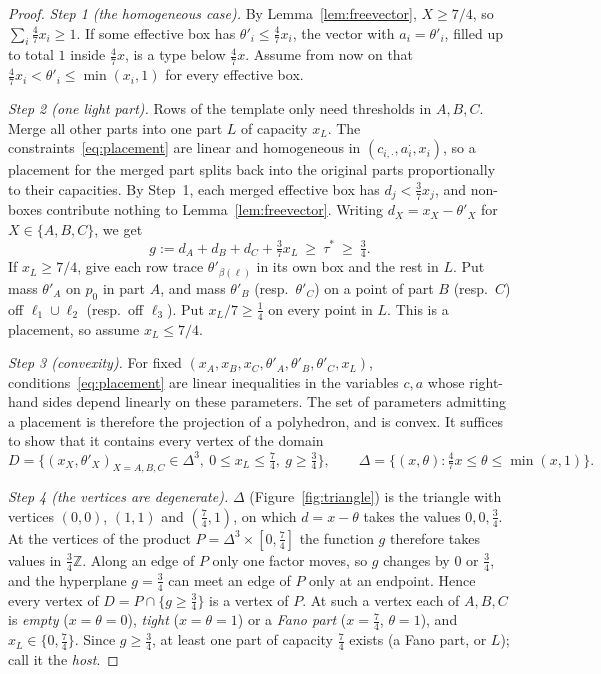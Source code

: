 \documentclass[11pt]{amsart}
\theoremstyle{definition}
\theoremstyle{remark}
\begin{document}
\begin{proof}
\emph{Step 1 (the homogeneous case).} By Lemma~\ref{lem:freevector}, $X\ge7/4$, so $\sum_i\frac47x_i\ge1$. If some effective box has $\theta'_i\le\frac47x_i$, the vector with $a_i=\theta'_i$, filled up to total $1$ inside $\frac47x$, is a type below $\frac47x$. Assume from now on that $\frac47x_i<\theta'_i\le\min(x_i,1)$ for every effective box.

\emph{Step 2 (one light part).} Rows of the template only need thresholds in $A,B,C$. Merge all other parts into one part $L$ of capacity $x_L$. The constraints~\eqref{eq:placement} are linear and homogeneous in $(c_{i,\cdot},a_{i}^{\cdot},x_i)$, so a placement for the merged part splits back into the original parts proportionally to their capacities. By Step~1, each merged effective box has $d_j<\frac37x_j$, and non-boxes contribute nothing to Lemma~\ref{lem:freevector}. Writing $d_X=x_X-\theta'_X$ for $X\in\{A,B,C\}$, we get
\begin{equation}\label{eq:g}
g:=d_A+d_B+d_C+\tfrac37x_L\ \ge\ \tau^*\ \ge\ \tfrac34 .
\end{equation}
If $x_L\ge7/4$, give each row trace $\theta'_{\beta(\ell)}$ in its own box and the rest in $L$. Put mass $\theta'_A$ on $p_0$ in part $A$, and mass $\theta'_B$ (resp.\ $\theta'_C$) on a point of part $B$ (resp.\ $C$) off $\ell_1\cup\ell_2$ (resp.\ off $\ell_3$). Put $x_L/7\ge\frac14$ on every point in $L$. This is a placement, so assume $x_L\le7/4$.

\emph{Step 3 (convexity).} For fixed $(x_A,x_B,x_C,\theta'_A,\theta'_B,\theta'_C,x_L)$, conditions~\eqref{eq:placement} are linear inequalities in the variables $c,a$ whose right-hand sides depend linearly on these parameters. The set of parameters admitting a placement is therefore the projection of a polyhedron, and is convex. It suffices to show that it contains every vertex of the domain
\[
D=\{(x_X,\theta'_X)_{X=A,B,C}\in\Delta^3,\ 0\le x_L\le\tfrac74,\ g\ge\tfrac34\},\qquad
\Delta=\{(x,\theta):\tfrac47x\le\theta\le\min(x,1)\}.
\]

\emph{Step 4 (the vertices are degenerate).} $\Delta$ (Figure~\ref{fig:triangle}) is the triangle with vertices $(0,0)$, $(1,1)$ and $(\frac74,1)$, on which $d=x-\theta$ takes the values $0,0,\frac34$. At the vertices of the product $P=\Delta^3\times[0,\frac74]$ the function $g$ therefore takes values in $\frac34\mathbb Z$. Along an edge of $P$ only one factor moves, so $g$ changes by $0$ or $\frac34$, and the hyperplane $g=\frac34$ can meet an edge of $P$ only at an endpoint. Hence every vertex of $D=P\cap\{g\ge\frac34\}$ is a vertex of $P$. At such a vertex each of $A,B,C$ is \emph{empty} ($x=\theta=0$), \emph{tight} ($x=\theta=1$) or a \emph{Fano part} ($x=\frac74$, $\theta=1$), and $x_L\in\{0,\frac74\}$. Since $g\ge\frac34$, at least one part of capacity $\frac74$ exists (a Fano part, or $L$); call it the \emph{host}.


\end{proof}
\end{document}
